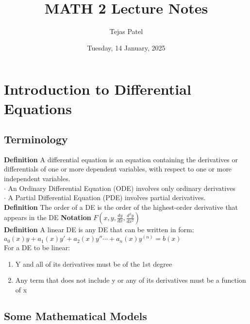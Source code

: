 \documentclass{article}
\title{MATH 2 Lecture Notes}
\date{Tuesday, 14 January, 2025}
\author{Tejas Patel}
\begin{document}
\maketitle
\tableofcontents
\pagebreak
\section{Introduction to Differential Equations}
\subsection{Terminology}
\textbf{Definition} A differential equation is an equation containing the derivatives or differentials 
of one or more dependent variables, with respect to one or more independent variables.\\
\textbf{$\cdot$} An Ordinary Differential Equation (ODE) involves only ordinary derivatives\\
\textbf{$\cdot$} A Partial Differential Equation (PDE) involves partial derivatives.\\
\textbf{Definition} The order of a DE is the order of the highest-order derivative that appears in the DE
\textbf{Notation} $F(x,y,\frac{dy}{dx}, \frac{d^2y}{dx^2})$\\
\textbf{Definition} A linear DE is any DE that can be written in form:\\
${\displaystyle a_{0}(x)y+a_{1}(x)y'+a_{2}(x)y''\cdots +a_{n}(x)y^{(n)}=b(x)}$\\
For a DE to be linear:
\begin{enumerate}
    \item Y and all of its derivatives must be of the 1st degree
    \item Any term that does not include y or any of its derivatives must be a function of x
\end{enumerate}
\subsection{Some Mathematical Models}
\end{document}

